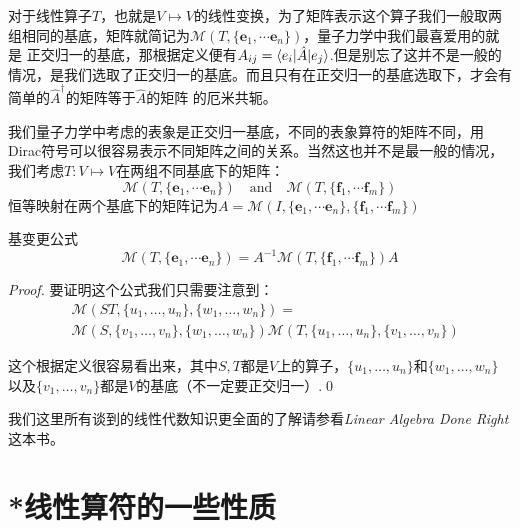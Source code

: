 对于线性算子$T$，也就是$V\mapsto V$的线性变换，为了矩阵表示这个算子我们一般取两组相同的基底，矩阵就简记为$\mathcal{M}(T,\{\mathbf{e}_1,\cdots\mathbf{e}_n\})$，量子力学中我们最喜爱用的就是
正交归一的基底，那根据定义便有$A_{ij}=\braket{e_i|\hat{A}|e_j}$.但是别忘了这并不是一般的情况，是我们选取了正交归一的基底。而且只有在正交归一的基底选取下，才会有简单的$\hat{A}^\dagger$的矩阵等于$\hat{A}$的矩阵
的厄米共轭。

我们量子力学中考虑的表象是正交归一基底，不同的表象算符的矩阵不同，用Dirac符号可以很容易表示不同矩阵之间的关系。当然这也并不是最一般的情况，我们考虑$T:V\mapsto V$在两组不同基底下的矩阵：
\[\mathcal{M}(T,\{\mathbf{e}_1,\cdots\mathbf{e}_n\})\quad \text{and} \quad\mathcal{M}(T,\{\mathbf{f}_1,\cdots\mathbf{f}_m\})\]
恒等映射在两个基底下的矩阵记为$A=\mathcal{M}(I,\{\mathbf{e}_1,\cdots\mathbf{e}_n\},\{\mathbf{f}_1,\cdots\mathbf{f}_m\})$
\begin{theorem}{基变更公式}
    \begin{equation*}
        \mathcal{M}(T,\{\mathbf{e}_1,\cdots\mathbf{e}_n\})=A^{-1}\mathcal{M}(T,\{\mathbf{f}_1,\cdots\mathbf{f}_m\})A
    \end{equation*}
\end{theorem}
\begin{proof}
    要证明这个公式我们只需要注意到：
    \begin{align*}
        &\mathcal{M}(ST,\{u_1,\ldots,u_n\},\{w_1,\ldots,w_n\})=\\
        &\mathcal{M}(S,\{v_1,\ldots,v_n\},\{w_1,\ldots,w_n\})\mathcal{M}(T,\{u_1,\ldots,u_n\},\{v_1,\ldots,v_n\})
    \end{align*}

    这个根据定义很容易看出来，其中$S,T$都是$V$上的算子，$\{u_1,\ldots,u_n\}$和$\{w_1,\ldots,w_n\}$以及$\{v_1,\ldots,v_n\}$都是$V$的基底（不一定要正交归一）.\qed
\end{proof}

我们这里所有谈到的线性代数知识更全面的了解请参看{\itshape Linear Algebra Done Right}这本书。

\section{*线性算符的一些性质}

